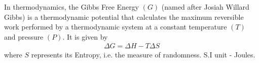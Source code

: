 \documentclass{article}
\begin{document}
\begin{chembox}
In thermodynamics, the {Gibbs Free Energy} $(G)$ (named after Josiah Willard Gibbs) is a {thermodynamic potential} that calculates the {maximum reversible work} performed by a thermodynamic system at a {constant temperature} $(T)$ and pressure{} $(P)$. It is given by 
\begin{align*} 
    \Delta G=\Delta H-T\Delta S 
\end{align*} where $S$ represents its {Entropy}, i.e. the measure of randomness. {S.I unit - Joules}.
\end{chembox}
\end{document}
